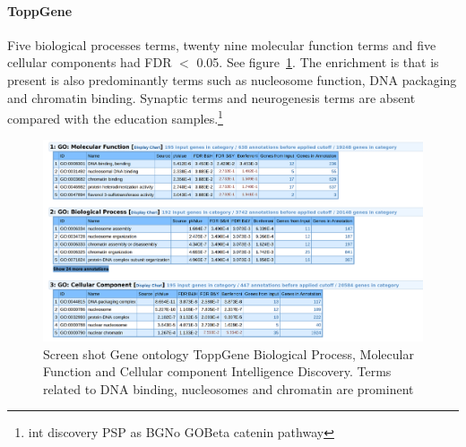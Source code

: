 

\paragraph{ToppGene}
 
Five biological processes terms, twenty nine molecular function terms and five cellular components had FDR $<$ 0.05. See figure~\ref{fig:toppgene pic}. The enrichment is that is present is also predominantly terms such as nucleosome function, DNA packaging and chromatin binding. Synaptic terms and neurogenesis terms are absent compared with the education samples.\footnote{int discovery PSP as BGNo GOBeta catenin pathway} 

\begin{figure}
    \centering
    \includegraphics[width=\textwidth]{images/chapter2/strontium/images_toppgene_all_groups.png}
    \caption{Screen shot Gene ontology ToppGene Biological Process, Molecular Function and Cellular component Intelligence Discovery. Terms related to DNA binding, nucleosomes and chromatin are prominent}
    \label{fig:toppgene pic}
\end{figure}







